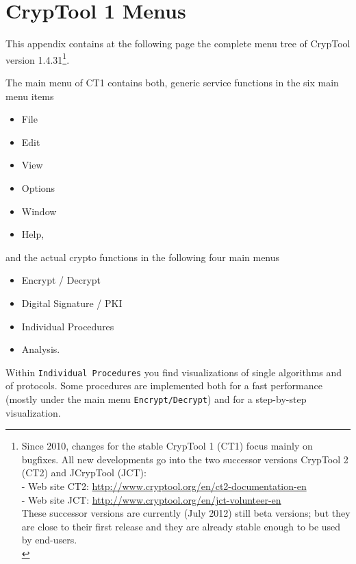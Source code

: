 
\newpage
\hypertarget{appendix-menu-overview-CT1}{}
\section{CrypTool 1 Menus}
\label{s:appendix-menu-overview-CT1}

This appendix contains at the following page the complete menu tree of
CrypTool version 1.4.31\footnote{%
  Since 2010, changes for the stable CrypTool 1 (CT1)
  focus mainly on bugfixes. All new developments go into the two successor
  versions CrypTool 2 (CT2) and
  JCrypTool (JCT):\\
  - Web site CT2: \url{http://www.cryptool.org/en/ct2-documentation-en} \\
  - Web site JCT: \url{http://www.cryptool.org/en/jct-volunteer-en} \\
  These successor versions are currently (July 2012) still beta versions;
  but they are close to their first release and they are already stable
  enough to be used by end-users.\\
}. 

\noindent The main menu of CT1 contains both, generic service functions in the
six main menu items
\begin{itemize}
   \item File
   \item Edit
   \item View
   \item Options
   \item Window
   \item Help,
\end{itemize}
and the actual crypto functions in the following four main menus
\begin{itemize}
   \item Encrypt / Decrypt
   \item Digital Signature / PKI
   \item Individual Procedures
   \item Analysis.
\end{itemize}

Within \verb#Individual Procedures# you find visualizations of single algorithms
and of protocols. Some procedures are implemented both for a fast performance
(mostly under the main menu \verb#Encrypt/Decrypt#) and for a step-by-step visualization.

